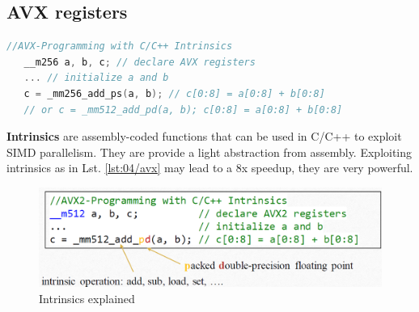 \subsection{AVX registers}

\begin{lstlisting}[language=C,label={lst:04/avx},caption={Intrinsics}]
   //AVX-Programming with C/C++ Intrinsics
   __m256 a, b, c; // declare AVX registers
   ... // initialize a and b
   c = _mm256_add_ps(a, b); // c[0:8] = a[0:8] + b[0:8]
   // or c = _mm512_add_pd(a, b); c[0:8] = a[0:8] + b[0:8]
\end{lstlisting}

\textbf{Intrinsics} are assembly-coded functions that can be used in C/C++ to exploit SIMD parallelism. They are provide a light abstraction from assembly.
Exploiting intrinsics as in Lst. \ref{lst:04/avx} may lead to a 8x speedup, they are very powerful.

\begin{figure}[htbp]
   \centering
   \includegraphics{images/04/intrinsics.png}
   \caption{Intrinsics explained}
   \label{fig:04/intrinsics}
\end{figure}